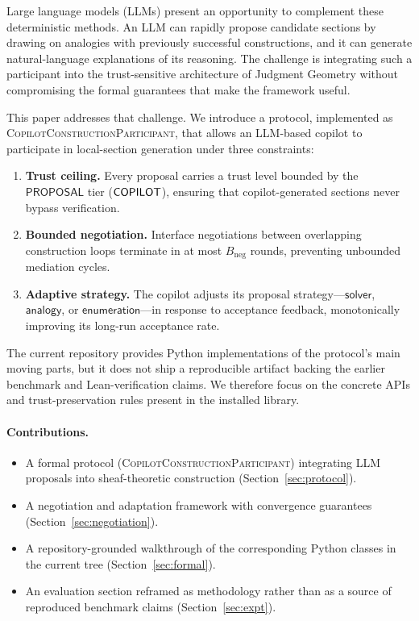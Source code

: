 \documentclass[11pt]{article}
\newcommand{\CCP}{\textsc{CopilotConstructionParticipant}}
\newcommand{\negbound}{B_{\mathrm{neg}}}
\begin{document}
Large language models (LLMs) present an opportunity to complement
these deterministic methods.  An LLM can rapidly propose candidate
sections by drawing on analogies with previously successful
constructions, and it can generate natural-language explanations of
its reasoning.  The challenge is integrating such a participant into
the trust-sensitive architecture of Judgment Geometry without
compromising the formal guarantees that make the framework useful.

This paper addresses that challenge.  We introduce a protocol,
implemented as \CCP{}, that allows an LLM-based copilot to
participate in local-section generation under three constraints:
\begin{enumerate}
  \item \textbf{Trust ceiling.}  Every proposal carries a trust level
        bounded by the $\mathsf{PROPOSAL}$ tier ($\mathsf{COPILOT}$), ensuring
        that copilot-generated sections never bypass verification.
  \item \textbf{Bounded negotiation.}  Interface negotiations between
        overlapping construction loops terminate in at most $\negbound$
        rounds, preventing unbounded mediation cycles.
  \item \textbf{Adaptive strategy.}  The copilot adjusts its proposal
        strategy---$\mathsf{solver}$, $\mathsf{analogy}$, or
        $\mathsf{enumeration}$---in response to acceptance feedback,
        monotonically improving its long-run acceptance rate.
\end{enumerate}

The current repository provides Python implementations of the protocol's
main moving parts, but it does not ship a reproducible artifact backing
the earlier benchmark and Lean-verification claims.  We therefore focus
on the concrete APIs and trust-preservation rules present in the
installed library.

\paragraph{Contributions.}
\begin{itemize}
  \item A formal protocol (\CCP{}) integrating LLM proposals into
         sheaf-theoretic construction (Section~\ref{sec:protocol}).
  \item A negotiation and adaptation framework with convergence
         guarantees (Section~\ref{sec:negotiation}).
  \item A repository-grounded walkthrough of the corresponding Python
        classes in the current \JuGeo{} tree (Section~\ref{sec:formal}).
  \item An evaluation section reframed as methodology rather than as a
        source of reproduced benchmark claims (Section~\ref{sec:expt}).
\end{itemize}
\end{document}
